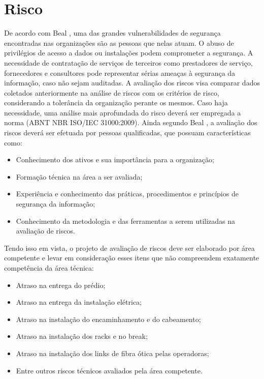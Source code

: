 \documentclass[	DIV=calc,%
							paper=a4,%
							fontsize=12pt,%
							onecolumn]{scrartcl}	 					%
\begin{document}
\section{Risco}
De acordo com Beal \cite{ID4}, uma das grandes vulnerabilidades de segurança encontradas nas organizações são as pessoas que nelas atuam. O abuso de privilégios de acesso a dados ou instalações podem comprometer a segurança. A necessidade de contratação de serviços de terceiros como prestadores de serviço, fornecedores e consultores pode representar sérias ameaças à segurança da informação, caso não sejam auditadas.
A avaliação dos riscos visa comparar dados coletados anteriormente na análise de riscos com os critérios de risco, considerando a tolerância da organização perante os mesmos. Caso haja necessidade, uma análise mais aprofundada do risco deverá ser empregada a norma (ABNT NBR ISO/IEC 31000:2009). Ainda segundo Beal \cite{ID4}, a avaliação dos riscos deverá ser efetuada por pessoas qualificadas, que possuam características como:
\begin{itemize}	
	\item Conhecimento dos ativos e sua importância para a organização; 
	\item Formação técnica na área a ser avaliada;
	\item Experiência e conhecimento das práticas, procedimentos e princípios de segurança da informação;
	\item Conhecimento da metodologia e das ferramentas a serem utilizadas na avaliação de riscos. 
\end{itemize}

Tendo isso em vista, o projeto de avaliação de riscos deve ser elaborado por área competente e levar em consideração esses itens que não compreendem exatamente competência da área técnica:
\begin{itemize}	
	\item Atraso na entrega do prédio; 
	\item Atraso na entrega da instalação elétrica;
	\item Atraso na instalação do encaminhamento e do cabeamento; 
	\item Atraso na instalação dos racks e no break; 
	\item Atraso na instalação dos links de fibra ótica pelas operadoras; 
	\item Entre outros riscos técnicos avaliados pela área competente. 
	
\end{itemize}
\end{document}
